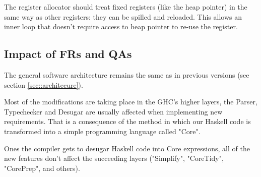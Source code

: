 \begin{design}
The register allocator should treat fixed registers (like the heap pointer) in the same way as other registers: they can be spilled and reloaded. This allows an inner loop that doesn't require access to heap pointer to re-use the register. \cite{wiki}
\end{design}


\subsection{Impact of FRs and QAs}

The general software architecture remains the same as in previous versions (see section \ref{sec::architecure}). 

Most of the modifications are taking place in the GHC's higher layers, the Parser, Typechecker and Desugar are usually affected when implementing new requirements. That is a consequence of the method in which our Haskell code is transformed into a simple programming language called "Core".

Ones the compiler gets to desugar Haskell code into Core expressions, all of the new features don't affect the succeeding layers ("Simplify", "CoreTidy", "CorePrep", and others).


